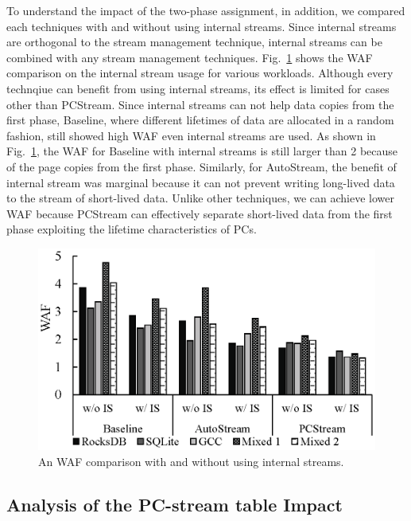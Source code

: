 To understand the impact of the
two-phase assignment, in addition, we compared each techniques
with and without using internal streams.
Since internal streams are orthogonal to the stream management technique,
internal streams can be combined with any stream management techniques.
Fig.~\ref{fig:internal} shows the WAF comparison on the internal stream usage 
for various workloads.
Although every technqiue can benefit from using internal streams,
its effect is limited for cases other than PCStream.
Since internal streams can not help data copies from the first phase,
Baseline, where different lifetimes of data 
are allocated in a random fashion, still showed high WAF even internal streams are used.
As shown in Fig.~\ref{fig:internal}, the WAF for Baseline with internal streams is still 
larger than 2 because of the page copies from the first phase.
Similarly, for AutoStream, the benefit of internal stream was marginal 
because it can not prevent writing long-lived data to the stream of short-lived data.
Unlike other techniques, we can achieve lower WAF because PCStream can effectively 
separate short-lived data from the first phase exploiting the lifetime characteristics of PCs.


\begin{figure}[t]
	\centering
	\includegraphics[width=0.9\linewidth]{figure/internal}
	\caption{An WAF comparison with and without using internal streams.}
	\label{fig:internal}
\end{figure}


\subsection{Analysis of the PC-stream table Impact}


